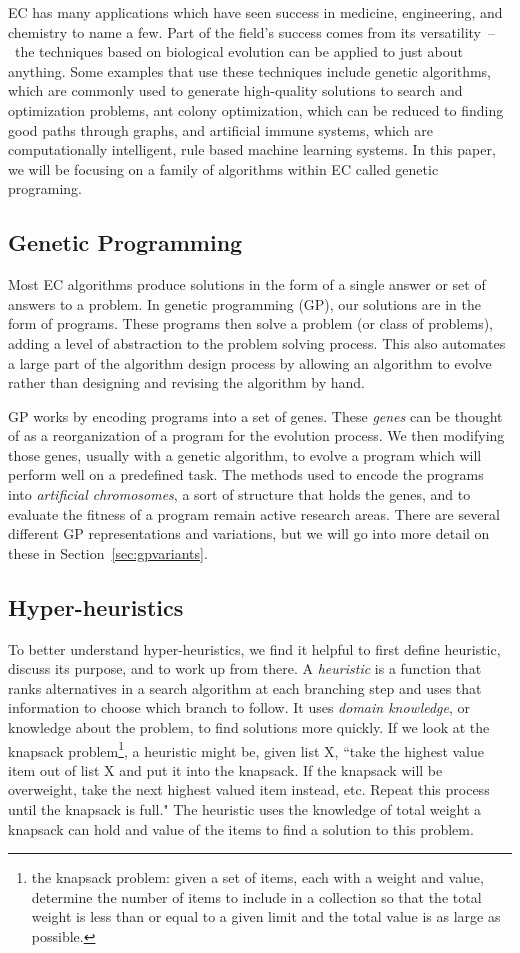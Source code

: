 \documentclass{sig-alternate}
\begin{document}
EC has many applications which have seen success in medicine, engineering, and chemistry to name a few. Part of the field's success comes from its versatility~--~the techniques based on biological evolution can be applied to just about anything. Some examples that use these techniques include genetic algorithms, which are commonly used to generate high-quality solutions to search and optimization problems, ant colony optimization, which can be reduced to finding good paths through graphs, and artificial immune systems, which are computationally intelligent, rule based machine learning systems. In this paper, we will be focusing on a family of algorithms within EC called genetic programing.

\subsection{Genetic Programming}
\label{sec:GP}
Most EC algorithms produce solutions in the form of a single answer or set of answers to a problem. In genetic programming (GP), our solutions are in the form of programs. These programs then solve a problem (or class of problems), adding a level of abstraction to the problem solving process. This also automates a large part of the algorithm design process by allowing an algorithm to evolve rather than designing and revising the algorithm by hand.

GP works by encoding programs into a set of genes. These \textit{genes} can be thought of as a reorganization of a program for the evolution process. We then modifying those genes, usually with a genetic algorithm, to evolve a program which will perform well on a predefined task. The methods used to encode the programs into \textit{artificial chromosomes}, a sort of structure that holds the genes, and to evaluate the fitness of a program remain active research areas. There are several different GP representations and variations, but we will go into more detail on these in Section~\ref{sec:gpvariants}.

\subsection{Hyper-heuristics}
\label{sec:HH}
To better understand hyper-heuristics, we find it helpful to first define heuristic, discuss its purpose, and to work up from there. A \textit{heuristic} is a function that ranks alternatives in a search algorithm at each branching step and uses that information to choose which branch to follow. It uses \textit{domain knowledge}, or knowledge about the problem, to find solutions more quickly. If we look at the knapsack problem\footnote{the knapsack problem: given a set of items, each with a weight and value, determine the number of items to include in a collection so that the total weight is less than or equal to a given limit and the total value is as large as possible.}, a heuristic might be, given list X, ``take the highest value item out of list X and put it into the knapsack. If the knapsack will be overweight, take the next highest valued item instead, etc. Repeat this process until the knapsack is full." The heuristic uses the knowledge of total weight a knapsack can hold and value of the items to find a solution to this problem.
\end{document}
